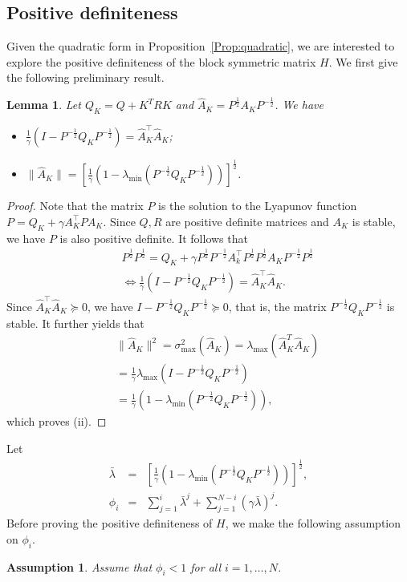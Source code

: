 \documentclass[letterpaper, 10 pt, conference]{ieeeconf}  %
\newtheorem{lemma}{Lemma}[section]
\newtheorem{assumption}{Assumption}[section]
\begin{document}
\subsection{Positive definiteness}
Given the quadratic form in Proposition~\ref{Prop:quadratic}, we are interested to explore the positive definiteness of the block symmetric matrix $H$. We first give the following preliminary result. 
\begin{lemma}\label{Lem:AhatK}
    Let $Q_K=Q+K^TRK$ and 
    $\hat{A}_{K}=P^{\frac{1}{2}} A_K P^{-\frac{1}{2}}$. We have 
    \begin{itemize}
    \item[(i)]   $\frac{1}{\gamma}\left(I-P^{-\frac{1}{2}}Q_KP^{-\frac{1}{2}}\right)=
\hat{A}_K^\top\hat{A}_K$;
    \item[(ii)] $\|\hat{A}_K\|=\left[\frac{1}{\gamma}\left(1-\lambda_{\min}\left(P^{-\frac{1}{2}}Q_{K}P^{-\frac{1}{2}}\right)\right)\right]^{\frac{1}{2}}$.
    \end{itemize}
\end{lemma}
\begin{proof}
    Note that the matrix $P$ is the solution to the Lyapunov function $P=Q_K+\gamma A_K^\top PA_K$. Since $Q,R$ are positive definite matrices and $A_K$ is stable, we have $P$ is also positive definite. It follows that 
\begin{eqnarray*}
&&P^{\frac{1}{2}}P^{\frac{1}{2}}=Q_K+\gamma P^{\frac{1}{2}}P^{-\frac{1}{2}}A_k^\top P^{\frac{1}{2}}P^{\frac{1}{2}}A_KP^{-\frac{1}{2}}P^{\frac{1}{2}}\\
&&\Leftrightarrow \frac{1}{\gamma}\left(I-P^{-\frac{1}{2}}Q_KP^{-\frac{1}{2}}\right) = \hat{A}_K^\top\hat{A}_K. 
 \end{eqnarray*}
 Since $\hat{A}_K^\top\hat{A}_K \succeq 0$, we have $I-P^{-\frac{1}{2}}Q_KP^{-\frac{1}{2}}\succeq 0$, that is, the matrix $P^{-\frac{1}{2}}Q_KP^{-\frac{1}{2}}$ is stable. 
 It further yields that  \begin{eqnarray*}
&& \|\hat{A}_K\|^2=\sigma^2_{\max}(\hat{A}_K)=\lambda_{\max}(\hat{A}_K^T\hat{A}_K) \\
&& = \frac{1}{\gamma}\lambda_{\max}(I-P^{-\frac{1}{2}}Q_KP^{-\frac{1}{2}}) \\
&&=\frac{1}{\gamma}\left(1-\lambda_{\min}(P^{-\frac{1}{2}}Q_KP^{-\frac{1}{2}})\right),
  \end{eqnarray*}
  which proves (ii). 
\end{proof}

  Let 
 \begin{eqnarray}
\bar{\lambda}&=&\left[\frac{1}{\gamma}\left(1-\lambda_{\min}\left(P^{-\frac{1}{2}}Q_{K}P^{-\frac{1}{2}}\right)\right)\right]^{\frac{1}{2}}, \label{Eq:barlambda}\\ 
\phi_i&=&\sum_{j=1}^i \bar{\lambda}^j+\sum_{j=1}^{N-i}(\gamma \bar{\lambda})^j. \label{Eq:phi} 
 \end{eqnarray}  Before proving the positive definiteness of $H$, we make the following assumption on $\phi_i$.
\begin{assumption}\label{Ass:phi}
Assume that $\phi_i < 1$ for all $i=1,\ldots, N$.
\end{assumption}
\end{document}

